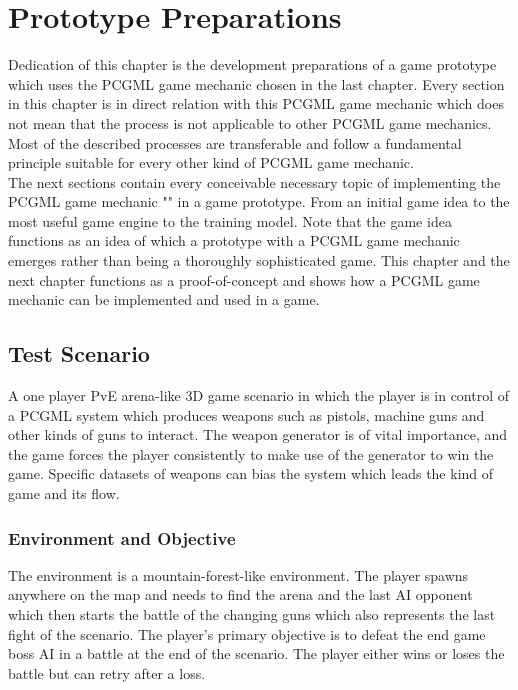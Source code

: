 \documentclass[MGS,Master,english]{twbook}%
\begin{document}
%
%
\clearpage
\chapter{Prototype Preparations} \label{chapter::gamePrototype}
Dedication of this chapter is the development preparations of a game prototype which uses the PCGML game mechanic chosen in the last chapter. Every section in this chapter is in direct relation with this PCGML game mechanic which does not mean that the process is not applicable to other PCGML game mechanics. Most of the described processes are transferable and follow a fundamental principle suitable for every other kind of PCGML game mechanic. \\
The next sections contain every conceivable necessary topic of implementing the PCGML game mechanic "" in a game prototype. From an initial game idea to the most useful game engine to the training model. Note that the game idea functions as an idea of which a prototype with a PCGML game mechanic emerges rather than being a thoroughly sophisticated game. This chapter and the next chapter functions as a proof-of-concept and shows how a PCGML game mechanic can be implemented and used in a game.

\section{Test Scenario}
A one player \ac{PvE} arena-like 3D game scenario in which the player is in control of a PCGML system which produces weapons such as pistols, machine guns and other kinds of guns to interact. The weapon generator is of vital importance, and the game forces the player consistently to make use of the generator to win the game. Specific datasets of weapons can bias the system which leads the kind of game and its flow. 

\subsection{Environment and Objective}
The environment is a mountain-forest-like environment. The player spawns anywhere on the map and needs to find the arena and the last AI opponent which then starts the battle of the changing guns which also represents the last fight of the scenario. The player's primary objective is to defeat the end game boss AI in a battle at the end of the scenario. The player either wins or loses the battle but can retry after a loss.
\end{document}
